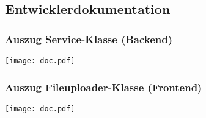 \subsection{Entwicklerdokumentation}
\label{app:Doc}

\subsubsection*{Auszug Service-Klasse (Backend)}

\begin{center}
	\texttt{[image: doc.pdf]}
\end{center}

\subsubsection*{Auszug Fileuploader-Klasse (Frontend)}

\begin{center}
	\texttt{[image: doc.pdf]}
\end{center}
 
 